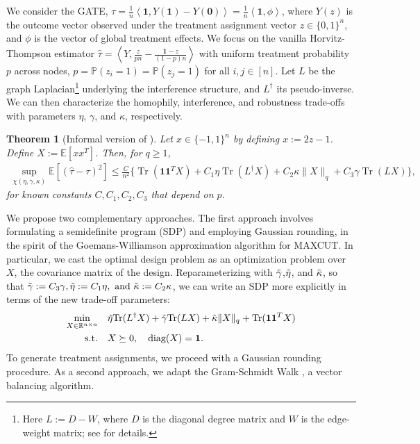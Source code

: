 \documentclass[12pt]{article}
\newtheorem{theorem}{Theorem}
\theoremstyle{definition}
\numberwithin{equation}{section}
\numberwithin{figure}{section}
\newcommand\dotp[1]{\left\langle #1 \right\rangle}
\numberwithin{equation}{section}
\numberwithin{figure}{section}
\begin{document}
We consider the GATE, $\tau = \frac{1}{n} \dotp{\mathbf{1},Y(\mathbf{1}) - Y(\mathbf{0}) }  = \frac{1}{n} \dotp{\mathbf{1}, \phi}$, where $Y(z)$ is the outcome vector observed under the treatment assignment vector $z \in \{0,1\}^n$, and $\phi$ is the vector of global treatment effects. We focus on the vanilla Horvitz-Thompson estimator $\hat{\tau} = \dotp{Y, \frac{z}{p n} - \frac{\mathbf{1}-z}{(1-p)n}}$ with uniform treatment probability $p$ across nodes, $p = \mathbb{P}(z_i = 1) = \mathbb{P}(z_j = 1)$ for all $i,j \in [n]$. Let $L$ be the graph Laplacian\footnote{Here $L := D - W$, where $D$ is the diagonal degree matrix and $W$ is the edge-weight matrix; see  for details.}
 underlying the interference structure, and $L^\dagger$ its pseudo-inverse. We can then characterize the homophily, interference, and robustness trade-offs with parameters $\eta$, $\gamma$, and $\kappa$, respectively.
\begin{theorem}[Informal version of ] \label{thm:mse_bound_general_HT_symmetric_short}
Let $x \in \{-1, 1\}^n$ by defining $x := 2z-1$. Define $X := \mathbb{E}[xx^T]$. Then, for $q \geq 1$, 
     \begin{align*}
          \sup_{\chi(\eta, \gamma, \kappa)} \mathbb{E}[(\hat{\tau} - \tau)^2] \leq \frac{C}{n^2} \{ \operatorname{Tr}(\mathbf{1}\mathbf{1}^T X) + C_1 \eta\operatorname{Tr}(L^{\dagger} X) + C_2 \kappa \|X\|_{q} + C_3 \gamma \operatorname{Tr}(L X) \},
     \end{align*}
for known constants $C, C_1, C_2, C_3$ 
that depend on $p$.
\end{theorem}
We propose two complementary approaches. The first approach involves formulating a semidefinite program (SDP) and employing Gaussian rounding, in the spirit of the Goemans-Williamson approximation algorithm \citep{goemans1995improved} for MAXCUT. In particular, we cast the optimal design problem as an optimization problem over $X$, the covariance matrix of the design. 
Reparameterizing with $\Tilde{\gamma}$,$\Tilde{\eta}$, and $\Tilde{\kappa}$, so that
$\Tilde{\gamma} := C_3 \gamma, \Tilde{\eta} := C_1 \eta ,\text{ and } \Tilde{\kappa} := C_2  \kappa$,
we can write an SDP more explicitly in terms of the new trade-off parameters:
\begin{align} \label{sdp_informal}
    \min_{X\in\mathbb{R}^{n\times n}} \quad & \Tilde{\eta}\text{Tr}(L^\dagger X)  +   \Tilde{\gamma} \text{Tr}(L X) + \Tilde{\kappa}\|X\|_{q} + \operatorname{Tr}(\mathbf{1}\mathbf{1}^TX) \\
    \text{s.t.} \quad & X \succeq  0, \quad \text{diag}(X) = \mathbf{1}. \notag 
\end{align} 
To generate treatment assignments, we proceed with a Gaussian rounding procedure. As a second approach, we adapt the Gram-Schmidt Walk \citep{harshaw2024balancing}, a vector balancing algorithm.
\end{document}

